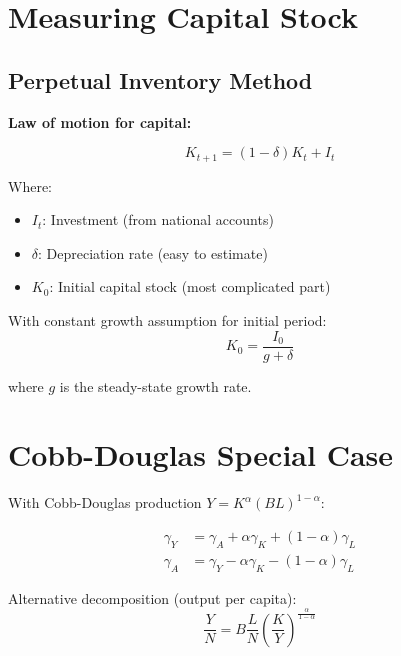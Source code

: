 \documentclass[a4paper,11pt]{article}
\newcommand{\gammay}{\gamma_Y}
\newcommand{\gammaA}{\gamma_A}
\newcommand\gammaK{\gamma_K}
\newcommand\gammaL{\gamma_L}
\begin{document}
\section{Measuring Capital Stock}

\subsection*{Perpetual Inventory Method}

\begin{derivationbox}
\textbf{Law of motion for capital:}

\[
K_{t+1} = (1-\delta)K_t + I_t
\tag{PIM-Motion}
\]

Where:
\begin{itemize}
    \item $I_t$: Investment (from national accounts)
    \item $\delta$: Depreciation rate (easy to estimate)
    \item $K_0$: Initial capital stock (most complicated part)
\end{itemize}

With constant growth assumption for initial period:
\[
K_0 = \frac{I_0}{g + \delta}
\tag{PIM-Initial}
\]

where $g$ is the steady-state growth rate.
\end{derivationbox}

\section{Cobb-Douglas Special Case}

With Cobb-Douglas production $Y = K^\alpha (BL)^{1-\alpha}$:

\begin{resultbox}
\begin{align*}
\gammay &= \gammaA + \alpha\gammaK + (1-\alpha)\gammaL \tag{CD-Growth-Accounting} \\
\gammaA &= \gammay - \alpha\gammaK - (1-\alpha)\gammaL
\end{align*}
\end{resultbox}

Alternative decomposition (output per capita):
\[
\frac{Y}{N} = B \frac{L}{N} \left(\frac{K}{Y}\right)^{\frac{\alpha}{1-\alpha}}
\tag{CD-Decomposition}
\]
\end{document}
